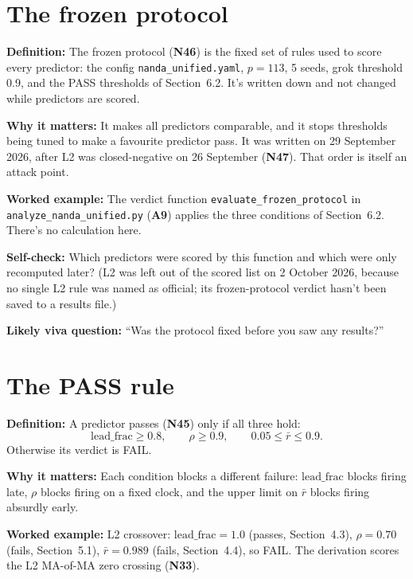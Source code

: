 \documentclass[11pt,a4paper,oneside,openany]{report}
\newcommand{\leadfrac}{\mathrm{lead\_frac}}
\newcommand{\rbar}{\bar{r}}
\newcommand{\code}[1]{\texttt{#1}}
\newcommand{\gl}[1]{\textbf{#1}}   %
\newcommand{\fdef}{\textbf{Definition:} }
\newcommand{\fwhy}{\par\textbf{Why it matters:} }
\newcommand{\fex}{\par\textbf{Worked example:} }
\newcommand{\fself}{\par\textbf{Self-check:} }
\newcommand{\fviva}{\par\textbf{Likely viva question:} }
\begin{document}
\section{The frozen protocol}
\fdef The frozen protocol (\gl{N46}) is the fixed set of rules used to score every predictor: the config \code{nanda\_\allowbreak{}unified.yaml}, $p = 113$, 5 seeds, grok threshold 0.9, and the PASS thresholds of Section~6.2. It's written down and not changed while predictors are scored.
\fwhy It makes all predictors comparable, and it stops thresholds being tuned to make a favourite predictor pass. It was written on 29 September 2026, after L2 was closed-negative on 26 September (\gl{N47}). That order is itself an attack point.
\fex The verdict function \code{evaluate\_\allowbreak{}frozen\_\allowbreak{}protocol} in \code{analyze\_\allowbreak{}nanda\_\allowbreak{}unified.py} (\gl{A9}) applies the three conditions of Section~6.2. There's no calculation here.
\fself Which predictors were scored by this function and which were only recomputed later? (L2 was left out of the scored list on 2 October 2026, because no single L2 rule was named as official; its frozen-protocol verdict hasn't been saved to a results file.)
\fviva ``Was the protocol fixed before you saw any results?''

\section{The PASS rule}
\fdef A predictor passes (\gl{N45}) only if all three hold:
\[\leadfrac \ge 0.8, \qquad \rho \ge 0.9, \qquad 0.05 \le \rbar \le 0.9.\]
Otherwise its verdict is FAIL.
\fwhy Each condition blocks a different failure: $\leadfrac$ blocks firing late, $\rho$ blocks firing on a fixed clock, and the upper limit on $\rbar$ blocks firing absurdly early.
\fex L2 crossover: $\leadfrac = 1.0$ (passes, Section~4.3), $\rho = 0.70$ (fails, Section~5.1), $\rbar = 0.989$ (fails, Section~4.4), so FAIL. The derivation scores the L2 MA-of-MA zero crossing (\gl{N33}).
\end{document}
